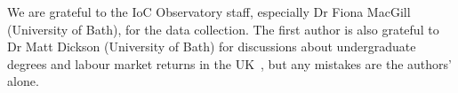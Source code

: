 \documentclass[conference]{IEEEtran}
\begin{document}
We are grateful to the IoC Observatory staff, especially Dr Fiona
MacGill (University of Bath), for the data collection. The first
author is also grateful to Dr Matt Dickson (University of Bath) for
discussions about undergraduate degrees and labour market returns in
the UK~\cite{DfE2018d}, but any mistakes are the authors' alone.


 
\end{document}
